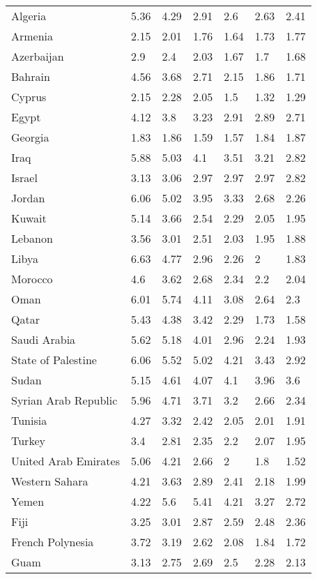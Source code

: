 \begin{longtable}[t]{lllllll}
Algeria & 5.36 & 4.29 & 2.91 & 2.6 & 2.63 & 2.41\\
Armenia & 2.15 & 2.01 & 1.76 & 1.64 & 1.73 & 1.77\\
Azerbaijan & 2.9 & 2.4 & 2.03 & 1.67 & 1.7 & 1.68\\
Bahrain & 4.56 & 3.68 & 2.71 & 2.15 & 1.86 & 1.71\\
\addlinespace
Cyprus & 2.15 & 2.28 & 2.05 & 1.5 & 1.32 & 1.29\\
Egypt & 4.12 & 3.8 & 3.23 & 2.91 & 2.89 & 2.71\\
Georgia & 1.83 & 1.86 & 1.59 & 1.57 & 1.84 & 1.87\\
Iraq & 5.88 & 5.03 & 4.1 & 3.51 & 3.21 & 2.82\\
Israel & 3.13 & 3.06 & 2.97 & 2.97 & 2.97 & 2.82\\
\addlinespace
Jordan & 6.06 & 5.02 & 3.95 & 3.33 & 2.68 & 2.26\\
Kuwait & 5.14 & 3.66 & 2.54 & 2.29 & 2.05 & 1.95\\
Lebanon & 3.56 & 3.01 & 2.51 & 2.03 & 1.95 & 1.88\\
Libya & 6.63 & 4.77 & 2.96 & 2.26 & 2 & 1.83\\
Morocco & 4.6 & 3.62 & 2.68 & 2.34 & 2.2 & 2.04\\
\addlinespace
Oman & 6.01 & 5.74 & 4.11 & 3.08 & 2.64 & 2.3\\
Qatar & 5.43 & 4.38 & 3.42 & 2.29 & 1.73 & 1.58\\
Saudi Arabia & 5.62 & 5.18 & 4.01 & 2.96 & 2.24 & 1.93\\
State of Palestine & 6.06 & 5.52 & 5.02 & 4.21 & 3.43 & 2.92\\
Sudan & 5.15 & 4.61 & 4.07 & 4.1 & 3.96 & 3.6\\
\addlinespace
Syrian Arab Republic & 5.96 & 4.71 & 3.71 & 3.2 & 2.66 & 2.34\\
Tunisia & 4.27 & 3.32 & 2.42 & 2.05 & 2.01 & 1.91\\
Turkey & 3.4 & 2.81 & 2.35 & 2.2 & 2.07 & 1.95\\
United Arab Emirates & 5.06 & 4.21 & 2.66 & 2 & 1.8 & 1.52\\
Western Sahara & 4.21 & 3.63 & 2.89 & 2.41 & 2.18 & 1.99\\
\addlinespace
Yemen & 4.22 & 5.6 & 5.41 & 4.21 & 3.27 & 2.72\\
Fiji & 3.25 & 3.01 & 2.87 & 2.59 & 2.48 & 2.36\\
French Polynesia & 3.72 & 3.19 & 2.62 & 2.08 & 1.84 & 1.72\\
Guam & 3.13 & 2.75 & 2.69 & 2.5 & 2.28 & 2.13\\

\end{longtable}
